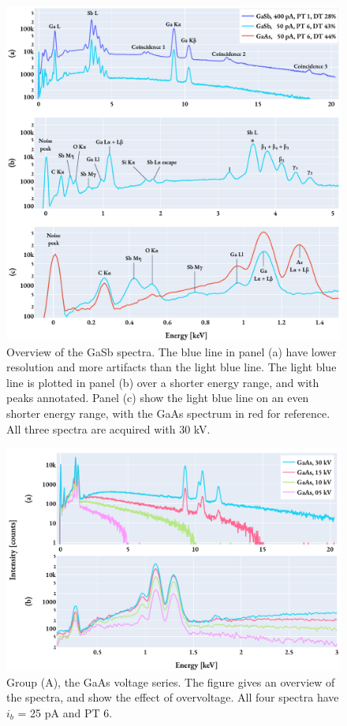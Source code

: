 \begin{figure}[hbtp]
    \centering
    \includegraphics[width=0.99\linewidth]{figures/results/spectrum_overviews.pdf}
    \caption{
        Overview of the GaSb spectra.
        The blue line in panel (a) have lower resolution and more artifacts than the light blue line.
        The light blue line is plotted in panel (b) over a shorter energy range, and with peaks annotated.
        Panel (c) show the light blue line on an even shorter energy range, with the GaAs spectrum in red for reference.
        All three spectra are acquired with 30 kV.
    }
    \label{fig:results:overviewGaSb_withArtifacts}
\end{figure}

\begin{figure}[hbtp]
    \centering
    \includegraphics[width=0.85\linewidth]{figures/results/GaAs_voltages.pdf}
    \caption{
        Group (A), the GaAs voltage series.
        The figure gives an overview of the spectra, and show the effect of overvoltage.
        All four spectra have $i_b$ = 25 pA and PT 6.
    }
    \label{fig:results:GaAs_voltages}
\end{figure}

